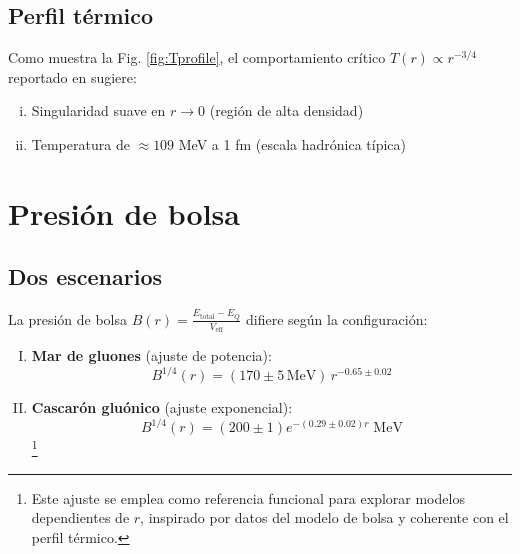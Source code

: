 \subsection{Perfil térmico}
Como muestra la Fig. \ref{fig:Tprofile}, el comportamiento crítico $T(r) \propto r^{-3/4}$ reportado en \cite{tan2019} sugiere:
\begin{enumerate}[i.]
    \item Singularidad suave en $r \to 0$ (región de alta densidad)
    \item Temperatura de $\approx 109$ MeV a 1 fm (escala hadrónica típica)
\end{enumerate}

\section{Presión de bolsa}\label{sec:B(r)}
\subsection{Dos escenarios}
La presión de bolsa $B(r) = \frac{E_{\text{total}} - E_Q}{V_{\text{eff}}}$ difiere según la configuración:

\begin{enumerate}[I.]
    \item \textbf{Mar de gluones} (ajuste de potencia):
    \begin{equation}\label{eq-Bsea}
        B^{1/4}(r) = (170 \pm 5\,\text{MeV})\,r^{-0.65 \pm 0.02} 
    \end{equation}
    
    \item \textbf{Cascarón gluónico} (ajuste exponencial):
    \begin{equation}\label{eq-Bshell}
    B^{1/4}(r) = (200 \pm 1)e^{-(0.29 \pm 0.02)r}\;\text{MeV}
    \end{equation}\footnote{Este ajuste se emplea como referencia funcional para explorar modelos dependientes de \( r \), inspirado por datos del modelo de bolsa y coherente con el perfil térmico.}
\end{enumerate}


